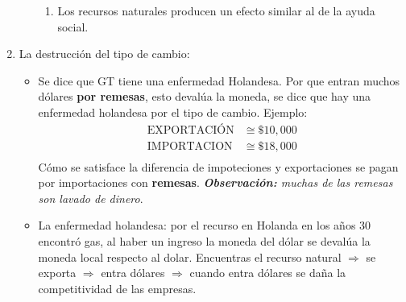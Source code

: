 \begin{enumerate}
\begin{itemize}
\begin{enumerate}
            \item Los recursos naturales producen un efecto similar al de la ayuda social.
        \end{enumerate}
    \end{itemize}
    
    \item La destrucción del tipo de cambio:
    \begin{itemize}
        \item Se dice que GT tiene una enfermedad Holandesa. Por que entran muchos dólares \textbf{por remesas}, esto devalúa la moneda, se dice que hay una enfermedad holandesa por el tipo de cambio. Ejemplo:
        \begin{align*}
            \text{EXPORTACIÓN} & \cong \$ 10,000 \\ 
            \text{IMPORTACION} & \cong \$ 18,000 \\ 
        \end{align*}
        Cómo se satisface la diferencia de impoteciones y exportaciones se pagan por importaciones con \textbf{remesas}. \emph{\textbf{Observación: }muchas de las remesas son lavado de dinero}.
        
        \item  La enfermedad holandesa: por el recurso en Holanda en los años 30 encontró gas, al haber un ingreso la moneda del dólar se devalúa la moneda local respecto al dolar. Encuentras el recurso natural $\Rightarrow $ se exporta $\Rightarrow $ entra dólares $\Rightarrow $ cuando entra dólares se daña la competitividad de las empresas.
    \end{itemize} 
\end{enumerate}


